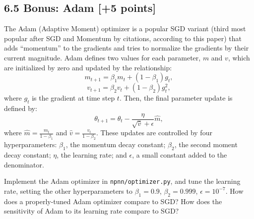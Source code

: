 \documentclass[a3paper,12pt]{extarticle} %
\begin{document}
\subsection*{6.5 Bonus: Adam [+5 points]}
The Adam (Adaptive Moment) optimizer is a popular SGD variant (third most popular after SGD and Momentum by citations, according to this paper) that adds “momentum” to the gradients and tries to normalize the gradients by their current magnitude. Adam defines two values for each parameter, $m$ and $v$, which are initialized by zero and updated by the relationship:
\[
m_{t+1} = \beta_1 m_t + (1 - \beta_1) g_t,
\]
\[
v_{t+1} = \beta_2 v_t + (1 - \beta_2) g_t^2,
\]
where $g_t$ is the gradient at time step $t$. Then, the final parameter update is defined by:
\[
\theta_{t+1} = \theta_t - \frac{\eta}{\sqrt{\hat{v}} + \epsilon} \hat{m},
\]
where $\hat{m} = \frac{m_t}{1 - \beta_1}$ and $\hat{v} = \frac{v_t}{1 - \beta_2}$. These updates are controlled by four hyperparameters: $\beta_1$, the momentum decay constant; $\beta_2$, the second moment decay constant; $\eta$, the learning rate; and $\epsilon$, a small constant added to the denominator.

Implement the Adam optimizer in \texttt{npnn/optimizer.py}, and tune the learning rate, setting the other hyperparameters to $\beta_1 = 0.9$, $\beta_2 = 0.999$, $\epsilon = 10^{-7}$. How does a properly-tuned Adam optimizer compare to SGD? How does the sensitivity of Adam to its learning rate compare to SGD?
\end{document}
